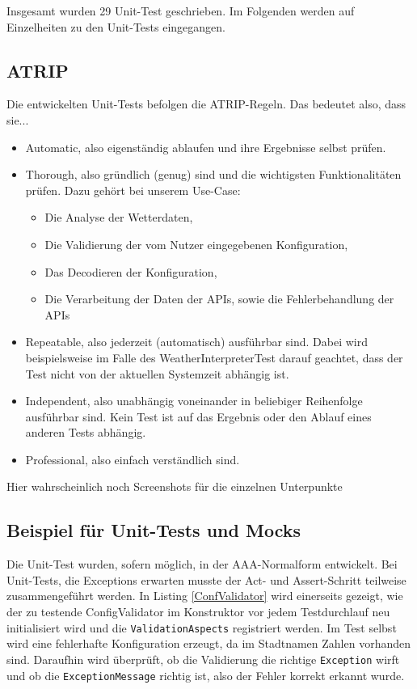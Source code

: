 Insgesamt wurden 29 Unit-Test geschrieben. Im Folgenden werden auf Einzelheiten zu den Unit-Tests eingegangen.
\subsection{ATRIP}
Die entwickelten Unit-Tests befolgen die ATRIP-Regeln.
Das bedeutet also, dass sie...
\begin{itemize}
\item Automatic, also eigenständig ablaufen und ihre Ergebnisse selbst prüfen.
\item Thorough, also gründlich (genug) sind und die wichtigsten Funktionalitäten prüfen. Dazu gehört bei unserem Use-Case:
\begin{itemize}
\item Die Analyse der Wetterdaten,
\item Die Validierung der vom Nutzer eingegebenen Konfiguration,
\item Das Decodieren der Konfiguration,
\item Die Verarbeitung der Daten der APIs, sowie die Fehlerbehandlung der APIs
\end{itemize}
\item Repeatable, also jederzeit (automatisch) ausführbar sind. Dabei wird beispielsweise im Falle des WeatherInterpreterTest darauf geachtet, dass der Test nicht von der aktuellen Systemzeit abhängig ist.
\item Independent, also unabhängig voneinander in beliebiger Reihenfolge ausführbar sind. Kein Test ist auf das Ergebnis oder den Ablauf eines anderen Tests abhängig.
\item Professional, also einfach verständlich sind.
\end{itemize}
Hier wahrscheinlich noch Screenshots für die einzelnen Unterpunkte
\subsection{Beispiel für Unit-Tests und Mocks}
Die Unit-Test wurden, sofern möglich, in der AAA-Normalform entwickelt. Bei Unit-Tests, die Exceptions erwarten musste der Act- und Assert-Schritt teilweise zusammengeführt werden. In Listing \ref{ConfValidator} wird einerseits gezeigt, wie der zu testende ConfigValidator im Konstruktor vor jedem Testdurchlauf neu initialisiert wird und die \texttt{ValidationAspects} registriert werden. Im Test selbst wird eine fehlerhafte Konfiguration erzeugt, da im Stadtnamen Zahlen vorhanden sind. Daraufhin wird überprüft, ob die Validierung die richtige \texttt{Exception} wirft und ob die \texttt{ExceptionMessage} richtig ist, also der Fehler korrekt erkannt wurde.

